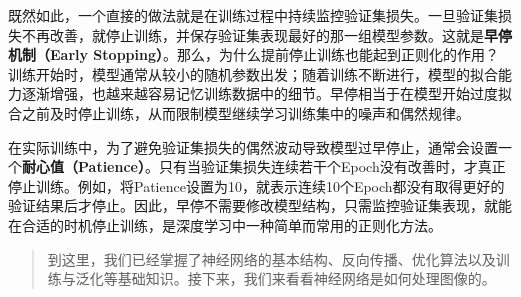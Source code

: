 既然如此，一个直接的做法就是在训练过程中持续监控验证集损失。一旦验证集损失不再改善，就停止训练，并保存验证集表现最好的那一组模型参数。这就是\textbf{早停机制（Early Stopping）}。那么，为什么提前停止训练也能起到正则化的作用？训练开始时，模型通常从较小的随机参数出发；随着训练不断进行，模型的拟合能力逐渐增强，也越来越容易记忆训练数据中的细节。早停相当于在模型开始过度拟合之前及时停止训练，从而限制模型继续学习训练集中的噪声和偶然规律。

在实际训练中，为了避免验证集损失的偶然波动导致模型过早停止，通常会设置一个\textbf{耐心值（Patience）}。只有当验证集损失连续若干个Epoch没有改善时，才真正停止训练。例如，将Patience设置为10，就表示连续10个Epoch都没有取得更好的验证结果后才停止。因此，早停不需要修改模型结构，只需监控验证集表现，就能在合适的时机停止训练，是深度学习中一种简单而常用的正则化方法。

\begin{quote}
    到这里，我们已经掌握了神经网络的基本结构、反向传播、优化算法以及训练与泛化等基础知识。接下来，我们来看看神经网络是如何处理图像的。
\end{quote}